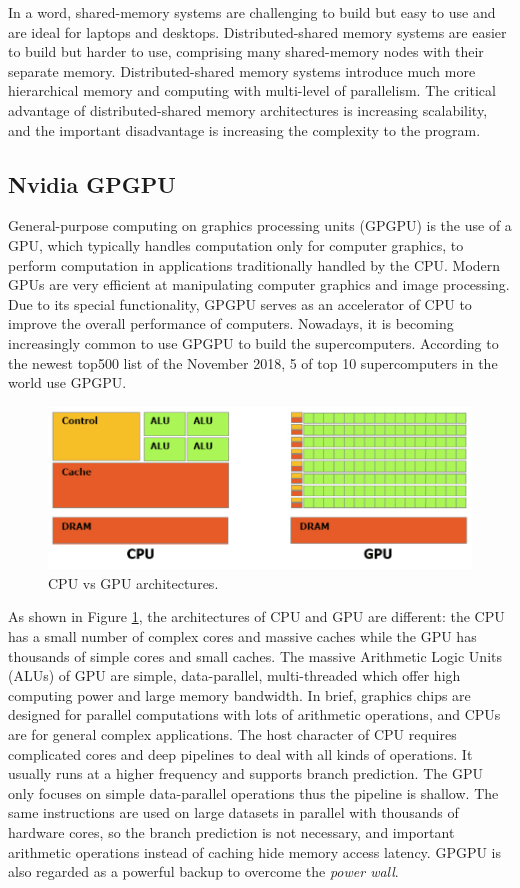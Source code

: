 In a word, shared-memory systems are challenging to build but easy to use and are ideal for laptops and desktops. Distributed-shared memory systems are easier to build but harder to use, comprising many shared-memory nodes with their separate memory. Distributed-shared memory systems introduce much more hierarchical memory and computing with multi-level of parallelism. The critical advantage of distributed-shared memory architectures is increasing scalability, and the important disadvantage is increasing the complexity to the program.

\subsection{Nvidia GPGPU}

General-purpose computing on graphics processing units (GPGPU) is the use of a GPU, which typically handles computation only for computer graphics, to perform computation in applications traditionally handled by the CPU. Modern GPUs are very efficient at manipulating computer graphics and image processing. Due to its special functionality, GPGPU serves as an accelerator of CPU to improve the overall performance of computers. Nowadays, it is becoming increasingly common to use GPGPU to build the supercomputers. According to the newest top500 list of the November 2018, 5 of top 10 supercomputers in the world use GPGPU.

\begin{figure}[htbp]
	\centering
	\includegraphics[width=0.99\linewidth]{fig/cpu_vs_gpu.png}
	\caption{CPU vs GPU architectures.}
	\label{cpuvsgpu}
\end{figure}

As shown in Figure \ref{cpuvsgpu}, the architectures of CPU and GPU are different: the CPU has a small number of complex cores and massive caches while the GPU has thousands of simple cores and small caches. The massive Arithmetic Logic Units (ALUs) of GPU are simple, data-parallel, multi-threaded which offer high computing power and large memory bandwidth. In brief, graphics chips are designed for parallel computations with lots of arithmetic operations, and CPUs are for general complex applications. The host character of CPU requires complicated cores and deep pipelines to deal with all kinds of operations. It usually runs at a higher frequency and supports branch prediction. The GPU only focuses on simple data-parallel operations thus the pipeline is shallow. The same instructions are used on large datasets in parallel with thousands of hardware cores, so the branch prediction is not necessary, and important arithmetic operations instead of caching hide memory access latency. GPGPU is also regarded as a powerful backup to overcome the \textit{power wall}.

